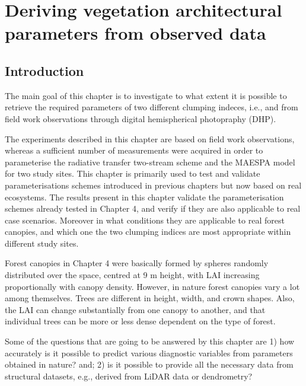 \documentclass[a4paper,11pt]{report}
\title{}
\author{Renato Kerches Braghiere \\ This document was written in \LaTeX \\ Number of words: 6814}
\date{\today}
\begin{document}
\maketitle
\setcounter{chapter}{4} %

\chapter{Deriving vegetation architectural parameters from observed data}

\section{Introduction}\label{introduction}

The main goal of this chapter is to investigate to what extent it is possible to retrieve the required parameters of two different clumping indeces, i.e., \citet{Nilson1971} and \citet{pinty2006} from field work observations through digital hemispherical photopraphy (DHP).

The experiments described in this chapter are based on field work observations, whereas a sufficient number of measurements were acquired in order to parameterise the radiative transfer two-stream scheme and the MAESPA model for two study sites. This chapter is primarily used to test and validate parameterisations schemes introduced in previous chapters but now based on real ecosystems. The results present in this chapter validate the parameterisation schemes already tested in Chapter 4, and verify if they are also applicable to real case scenarios. Moreover in what conditions they are applicable to real forest canopies, and which one the two clumping indices are most appropriate within different study sites.

Forest canopies in Chapter 4 were basically formed by spheres randomly distributed over the space, centred at 9 m height, with LAI increasing proportionally with canopy density. However, in nature forest canopies vary a lot among themselves. Trees are different in height, width, and crown shapes. Also, the LAI can change substantially from one canopy to another, and that individual trees can be more or less dense dependent on the type of forest. 

Some of the questions that are going to be answered by this chapter are 1) how accurately is it possible to predict various diagnostic variables from parameters obtained in nature? and; 2) is it possible to provide all the necessary data from structural datasets, e.g., derived from LiDAR data or dendrometry?
\end{document}
